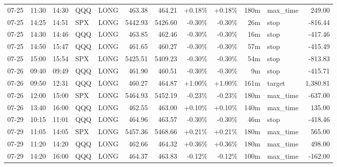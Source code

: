 \documentclass[11pt,a4paper,twoside]{article}
\begin{document}
\begin{center}
\begin{longtable}{>{\color{txtmain}}l l l l l r r r r r >{\color{txtmain}}l r}
07-25 & 11:30 & 14:30 & QQQ & LONG & 463.38 & 464.21 & \textcolor{wingreen}{+0.18\%} & \textcolor{wingreen}{+0.18\%} & 180m & max\_time & \textcolor{wingreen}{249.00} \\
07-25 & 14:25 & 14:51 & SPX & LONG & 5442.93 & 5426.60 & \textcolor{lossred}{-0.30\%} & \textcolor{lossred}{-0.30\%} & 26m & stop & \textcolor{lossred}{-816.44} \\
07-25 & 14:30 & 14:46 & QQQ & LONG & 463.85 & 462.46 & \textcolor{lossred}{-0.30\%} & \textcolor{lossred}{-0.30\%} & 16m & stop & \textcolor{lossred}{-417.46} \\
07-25 & 14:50 & 15:47 & QQQ & LONG & 461.65 & 460.27 & \textcolor{lossred}{-0.30\%} & \textcolor{lossred}{-0.30\%} & 57m & stop & \textcolor{lossred}{-415.49} \\
07-25 & 15:00 & 15:54 & SPX & LONG & 5425.51 & 5409.23 & \textcolor{lossred}{-0.30\%} & \textcolor{lossred}{-0.30\%} & 54m & stop & \textcolor{lossred}{-813.83} \\
07-26 & 09:40 & 09:49 & QQQ & LONG & 461.90 & 460.51 & \textcolor{lossred}{-0.30\%} & \textcolor{lossred}{-0.30\%} & 9m & stop & \textcolor{lossred}{-415.71} \\
07-26 & 09:50 & 12:31 & QQQ & LONG & 460.27 & 464.87 & \textcolor{wingreen}{+1.00\%} & \textcolor{wingreen}{+1.00\%} & 161m & target & \textcolor{wingreen}{1,380.81} \\
07-26 & 12:00 & 15:00 & SPX & LONG & 5464.93 & 5452.19 & \textcolor{lossred}{-0.23\%} & \textcolor{lossred}{-0.23\%} & 180m & max\_time & \textcolor{lossred}{-637.00} \\
07-26 & 13:40 & 16:00 & QQQ & LONG & 462.55 & 463.00 & \textcolor{wingreen}{+0.10\%} & \textcolor{wingreen}{+0.10\%} & 140m & max\_time & \textcolor{wingreen}{135.00} \\
07-29 & 10:15 & 11:01 & QQQ & LONG & 464.96 & 463.57 & \textcolor{lossred}{-0.30\%} & \textcolor{lossred}{-0.30\%} & 46m & stop & \textcolor{lossred}{-418.46} \\
07-29 & 11:05 & 14:05 & SPX & LONG & 5457.36 & 5468.66 & \textcolor{wingreen}{+0.21\%} & \textcolor{wingreen}{+0.21\%} & 180m & max\_time & \textcolor{wingreen}{565.00} \\
07-29 & 11:20 & 14:20 & QQQ & LONG & 462.66 & 464.32 & \textcolor{wingreen}{+0.36\%} & \textcolor{wingreen}{+0.36\%} & 180m & max\_time & \textcolor{wingreen}{498.00} \\
07-29 & 14:20 & 16:00 & QQQ & LONG & 464.37 & 463.83 & \textcolor{lossred}{-0.12\%} & \textcolor{lossred}{-0.12\%} & 100m & max\_time & \textcolor{lossred}{-162.00} \\

\end{longtable}
\end{center}
\end{document}
